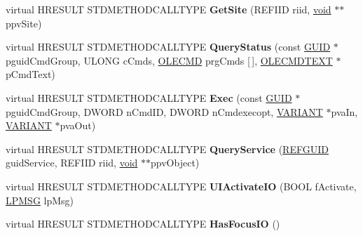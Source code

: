 \begin{DoxyCompactItemize}
\item 
\mbox{\label{class_c_explorer_band_adb021b7941414d87b324592ac1a05deb}} 
virtual H\+R\+E\+S\+U\+LT S\+T\+D\+M\+E\+T\+H\+O\+D\+C\+A\+L\+L\+T\+Y\+PE {\bfseries Get\+Site} (R\+E\+F\+I\+ID riid, \hyperlink{interfacevoid}{void} $\ast$$\ast$ppv\+Site)
\item 
\mbox{\label{class_c_explorer_band_abd1c82892393bed4c3003ae18a51b912}} 
virtual H\+R\+E\+S\+U\+LT S\+T\+D\+M\+E\+T\+H\+O\+D\+C\+A\+L\+L\+T\+Y\+PE {\bfseries Query\+Status} (const \hyperlink{interface_g_u_i_d}{G\+U\+ID} $\ast$pguid\+Cmd\+Group, U\+L\+O\+NG c\+Cmds, \hyperlink{struct_i_ole_command_target_1_1__tag_o_l_e_c_m_d}{O\+L\+E\+C\+MD} prg\+Cmds \mbox{[}$\,$\mbox{]}, \hyperlink{struct_i_ole_command_target_1_1__tag_o_l_e_c_m_d_t_e_x_t}{O\+L\+E\+C\+M\+D\+T\+E\+XT} $\ast$p\+Cmd\+Text)
\item 
\mbox{\label{class_c_explorer_band_a5ded711bca4a64dc5f3c8dc6efabe74d}} 
virtual H\+R\+E\+S\+U\+LT S\+T\+D\+M\+E\+T\+H\+O\+D\+C\+A\+L\+L\+T\+Y\+PE {\bfseries Exec} (const \hyperlink{interface_g_u_i_d}{G\+U\+ID} $\ast$pguid\+Cmd\+Group, D\+W\+O\+RD n\+Cmd\+ID, D\+W\+O\+RD n\+Cmdexecopt, \hyperlink{structtag_v_a_r_i_a_n_t}{V\+A\+R\+I\+A\+NT} $\ast$pva\+In, \hyperlink{structtag_v_a_r_i_a_n_t}{V\+A\+R\+I\+A\+NT} $\ast$pva\+Out)
\item 
\mbox{\label{class_c_explorer_band_a89607485afa8c432cc08c62227a88e72}} 
virtual H\+R\+E\+S\+U\+LT S\+T\+D\+M\+E\+T\+H\+O\+D\+C\+A\+L\+L\+T\+Y\+PE {\bfseries Query\+Service} (\hyperlink{struct___g_u_i_d}{R\+E\+F\+G\+U\+ID} guid\+Service, R\+E\+F\+I\+ID riid, \hyperlink{interfacevoid}{void} $\ast$$\ast$ppv\+Object)
\item 
\mbox{\label{class_c_explorer_band_a75d295c98ed11761338ae2bc73e4e3e2}} 
virtual H\+R\+E\+S\+U\+LT S\+T\+D\+M\+E\+T\+H\+O\+D\+C\+A\+L\+L\+T\+Y\+PE {\bfseries U\+I\+Activate\+IO} (B\+O\+OL f\+Activate, \hyperlink{structtag_m_s_g}{L\+P\+M\+SG} lp\+Msg)
\item 
\mbox{\label{class_c_explorer_band_ab8576fa7c0fbe549b9add0a3cb2fd42b}} 
virtual H\+R\+E\+S\+U\+LT S\+T\+D\+M\+E\+T\+H\+O\+D\+C\+A\+L\+L\+T\+Y\+PE {\bfseries Has\+Focus\+IO} ()

\end{DoxyCompactItemize}
